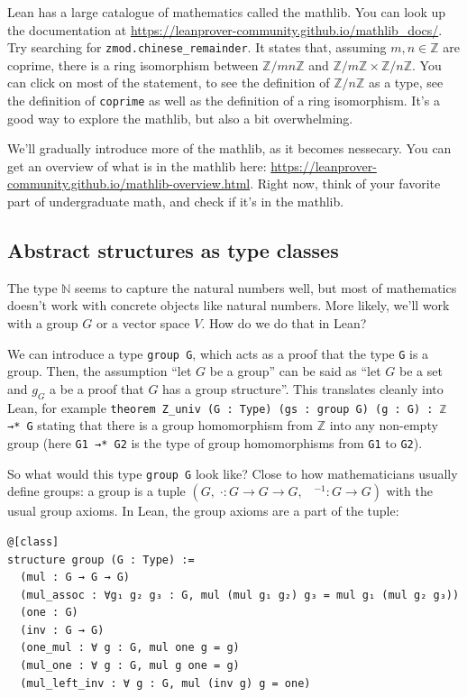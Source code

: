 \documentclass[a4paper, 12pt]{article}
\newcommand{\N}{\mathbb{N}}
\newcommand{\Z}{\mathbb{Z}}
\newcommand{\lean}[1]{\texttt{#1}}
\theoremstyle{changedot}
\theoremstyle{changedotbreak}
\theoremstyle{nonumberplain}
\begin{document}
Lean has a large catalogue of mathematics called the mathlib. You can look up the documentation at {\footnotesize \url{https://leanprover-community.github.io/mathlib_docs/}}. Try searching for \lean{zmod.chinese_remainder}. It states that, assuming $m, n \in \Z$ are coprime, there is a ring isomorphism between $\Z/mn\Z$ and $\Z/m\Z \times \Z/n\Z$. You can click on most of the statement, to see the definition of $\Z/n\Z$ as a type, see the definition of \lean{coprime} as well as the definition of a ring isomorphism. It's a good way to explore the mathlib, but also a bit overwhelming.

We'll gradually introduce more of the mathlib, as it becomes nessecary. You can get an overview of what is in the mathlib here: {\footnotesize \url{https://leanprover-community.github.io/mathlib-overview.html}}. Right now, think of your favorite part of undergraduate math, and check if it's in the mathlib.

\subsection{Abstract structures as type classes}
The type $\N$ seems to capture the natural numbers well, but most of mathematics doesn't work with concrete objects like natural numbers. More likely, we'll work with a group $G$ or a vector space $V$. How do we do that in Lean?

We can introduce a type \lean{group G}, which acts as a proof that the type \lean{G} is a group. Then, the assumption ``let $G$ be a group'' can be said as ``let $G$ be a set and $g_{G}$ a be a proof that $G$ has a group structure''. This translates cleanly into Lean, for example \lean{theorem Z_univ (G : Type) (gs : group G) (g : G)  : ℤ →* G} stating that there is a group homomorphism from $\Z$ into any non-empty group (here \lean{G1 →* G2} is the type of group homomorphisms from \lean{G1} to \lean{G2}).

So what would this type \lean{group G} look like? Close to how mathematicians usually define groups: a group is a tuple $(G,\; \cdot : G \to G \to G,\;\;\; ^{-1} : G \to G)$ with the usual group axioms. In Lean, the group axioms are a part of the tuple:

\begin{verbatim}
@[class]
structure group (G : Type) :=
  (mul : G → G → G)
  (mul_assoc : ∀g₁ g₂ g₃ : G, mul (mul g₁ g₂) g₃ = mul g₁ (mul g₂ g₃))
  (one : G)
  (inv : G → G)
  (one_mul : ∀ g : G, mul one g = g)
  (mul_one : ∀ g : G, mul g one = g)
  (mul_left_inv : ∀ g : G, mul (inv g) g = one)
\end{verbatim}
\end{document}
